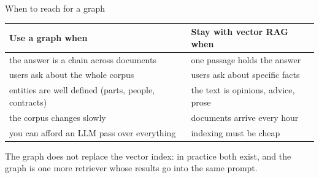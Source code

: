 \documentclass[aspectratio=169]{beamer}
\newcommand{\takebox}[1]{%
  \begin{tcolorbox}[colback=paramgreen!8, colframe=paramgreen, boxrule=0.6pt, arc=2pt]
  #1
  \end{tcolorbox}}
\begin{document}
\begin{frame}{When to reach for a graph}
  \vspace{0.3em}
  \begin{center}
  \small
  \begin{tabular}{>{\raggedright\arraybackslash}p{}>{\raggedright\arraybackslash}p{}}
    \toprule
    \textbf{Use a graph when} & \textbf{Stay with vector RAG when} \\
    \midrule
    the answer is a chain across documents & one passage holds the answer \\
    users ask about the whole corpus & users ask about specific facts \\
    entities are well defined (parts, people, contracts) & the text is opinions, advice, prose \\
    the corpus changes slowly & documents arrive every hour \\
    you can afford an LLM pass over everything & indexing must be cheap \\
    \bottomrule
  \end{tabular}
  \end{center}

  \vspace{0.4em}
  \takebox{\small The graph does not replace the vector index: in practice both exist, and the
  graph is one more retriever whose results go into the same prompt.}
\end{frame}
\end{document}
